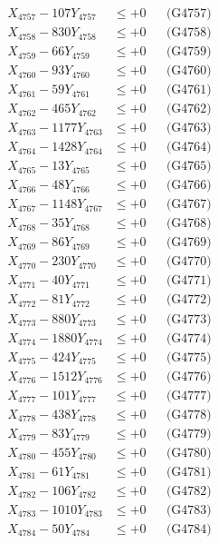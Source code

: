 \documentclass[a4paper,10pt]{article}
\begin{document}
{\begin{align}
X_{4757} - 107Y_{4757} &\leq +0 && \text{(G4757)} \\
X_{4758} - 830Y_{4758} &\leq +0 && \text{(G4758)} \\
X_{4759} - 66Y_{4759} &\leq +0 && \text{(G4759)} \\
X_{4760} - 93Y_{4760} &\leq +0 && \text{(G4760)} \\
\allowbreak
X_{4761} - 59Y_{4761} &\leq +0 && \text{(G4761)} \\
X_{4762} - 465Y_{4762} &\leq +0 && \text{(G4762)} \\
X_{4763} - 1177Y_{4763} &\leq +0 && \text{(G4763)} \\
X_{4764} - 1428Y_{4764} &\leq +0 && \text{(G4764)} \\
X_{4765} - 13Y_{4765} &\leq +0 && \text{(G4765)} \\
X_{4766} - 48Y_{4766} &\leq +0 && \text{(G4766)} \\
X_{4767} - 1148Y_{4767} &\leq +0 && \text{(G4767)} \\
X_{4768} - 35Y_{4768} &\leq +0 && \text{(G4768)} \\
X_{4769} - 86Y_{4769} &\leq +0 && \text{(G4769)} \\
X_{4770} - 230Y_{4770} &\leq +0 && \text{(G4770)} \\
\allowbreak
X_{4771} - 40Y_{4771} &\leq +0 && \text{(G4771)} \\
X_{4772} - 81Y_{4772} &\leq +0 && \text{(G4772)} \\
X_{4773} - 880Y_{4773} &\leq +0 && \text{(G4773)} \\
X_{4774} - 1880Y_{4774} &\leq +0 && \text{(G4774)} \\
X_{4775} - 424Y_{4775} &\leq +0 && \text{(G4775)} \\
X_{4776} - 1512Y_{4776} &\leq +0 && \text{(G4776)} \\
X_{4777} - 101Y_{4777} &\leq +0 && \text{(G4777)} \\
X_{4778} - 438Y_{4778} &\leq +0 && \text{(G4778)} \\
X_{4779} - 83Y_{4779} &\leq +0 && \text{(G4779)} \\
X_{4780} - 455Y_{4780} &\leq +0 && \text{(G4780)} \\
\allowbreak
X_{4781} - 61Y_{4781} &\leq +0 && \text{(G4781)} \\
X_{4782} - 106Y_{4782} &\leq +0 && \text{(G4782)} \\
X_{4783} - 1010Y_{4783} &\leq +0 && \text{(G4783)} \\
X_{4784} - 50Y_{4784} &\leq +0 && \text{(G4784)} \\

\end{align}}
\end{document}
